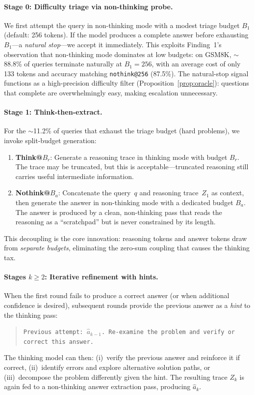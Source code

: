 \paragraph{Stage 0: Difficulty triage via non-thinking probe.}
We first attempt the query in non-thinking mode with a modest triage
budget $B_1$ (default: 256 tokens).
If the model produces a complete answer before exhausting $B_1$---a
\emph{natural stop}---we accept it immediately.
This exploits Finding~1's observation that non-thinking mode dominates
at low budgets: on GSM8K, ${\sim}$88.8\% of queries terminate naturally
at $B_1{=}256$, with an average cost of only 133 tokens and accuracy
matching \texttt{nothink@256} (87.5\%).
The natural-stop signal functions as a high-precision difficulty filter
(Proposition~\ref{prop:oracle}): questions that complete are
overwhelmingly easy, making escalation unnecessary.

\paragraph{Stage 1: Think-then-extract.}
For the ${\sim}$11.2\% of queries that exhaust the triage budget (hard
problems), we invoke split-budget generation:
\begin{enumerate}[nosep,leftmargin=*]
  \item \textbf{Think@$B_r$}: Generate a reasoning trace in thinking
    mode with budget $B_r$.
    The trace may be truncated, but this is acceptable---truncated
    reasoning still carries useful intermediate information.
  \item \textbf{Nothink@$B_a$}: Concatenate the query~$q$ and reasoning
    trace~$Z_1$ as context, then generate the answer in non-thinking
    mode with a dedicated budget $B_a$.
    The answer is produced by a clean, non-thinking pass that reads
    the reasoning as a ``scratchpad'' but is never constrained by its length.
\end{enumerate}
This decoupling is the core innovation: reasoning tokens and answer
tokens draw from \emph{separate budgets}, eliminating the zero-sum
coupling that causes the thinking tax.

\paragraph{Stages $k \ge 2$: Iterative refinement with hints.}
When the first round fails to produce a correct answer (or when
additional confidence is desired), subsequent rounds provide the
previous answer as a \emph{hint} to the thinking pass:
\begin{quote}
  \texttt{Previous attempt: $\hat{a}_{k-1}$. Re-examine the problem
  and verify or correct this answer.}
\end{quote}
The thinking model can then:
(i)~verify the previous answer and reinforce it if correct,
(ii)~identify errors and explore alternative solution paths, or
(iii)~decompose the problem differently given the hint.
The resulting trace $Z_k$ is again fed to a non-thinking answer
extraction pass, producing $\hat{a}_k$.


